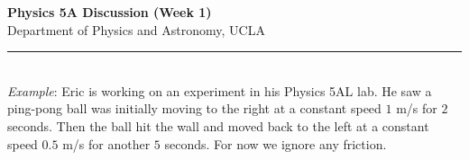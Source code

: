 \documentclass[11pt]{article}
\begin{document}
\Large \noindent \textbf{Physics 5A Discussion (Week 1)}\\
\normalsize
Department of Physics and Astronomy, UCLA\\
\noindent\rule{8cm}{0.4pt}\\


%

\noindent\textit{Example}: 
Eric is working on an experiment in his Physics 5AL lab. He saw a ping-pong ball was initially moving to the right at a constant speed $1$ m/s for $2$ seconds. Then the ball hit the wall and moved back to the left at a constant speed $0.5$ m/s for another $5$ seconds. For now we ignore any friction.\\
\end{document}
